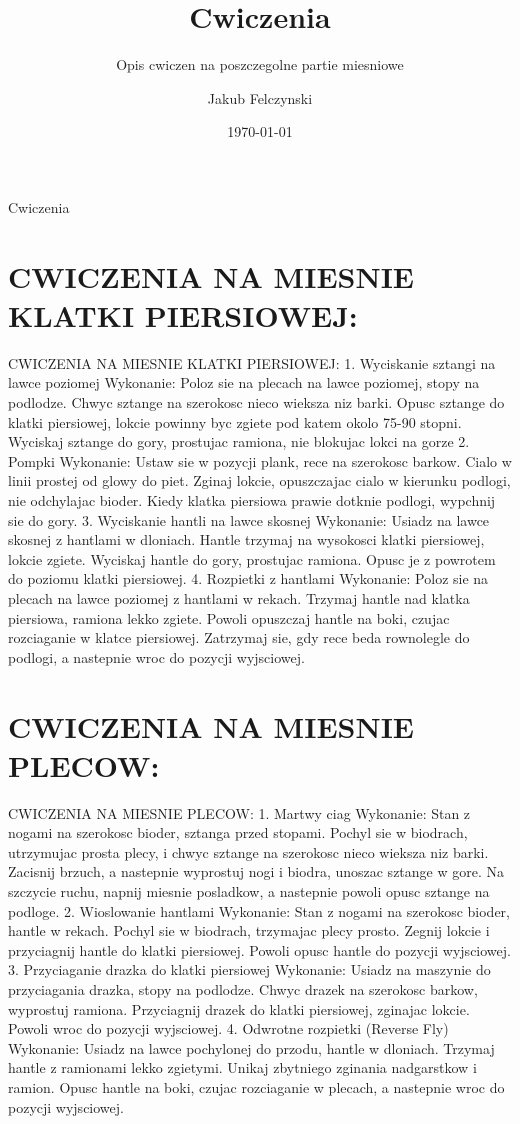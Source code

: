 \documentclass{beamer}
\title{Cwiczenia}
\subtitle{Opis cwiczen na poszczegolne partie miesniowe}
\author{Jakub Felczynski}
\date{\today}
\begin{document}
\begin{frame}{Cwiczenia}
\titlepage
\end{frame}
\section{CWICZENIA NA MIESNIE KLATKI PIERSIOWEJ:}
\begin{frame}{CWICZENIA NA MIESNIE KLATKI PIERSIOWEJ:}
1. Wyciskanie sztangi na lawce poziomej
Wykonanie:
Poloz sie na plecach na lawce poziomej, stopy na podlodze.
Chwyc sztange na szerokosc nieco wieksza niz barki.
Opusc sztange do klatki piersiowej, lokcie powinny byc zgiete pod katem okolo 75-90 stopni.
Wyciskaj sztange do gory, prostujac ramiona, nie blokujac lokci na gorze
2. Pompki
Wykonanie:
Ustaw sie w pozycji plank, rece na szerokosc barkow.
Cialo w linii prostej od glowy do piet.
Zginaj lokcie, opuszczajac cialo w kierunku podlogi, nie odchylajac bioder.
Kiedy klatka piersiowa prawie dotknie podlogi, wypchnij sie do gory.
3. Wyciskanie hantli na lawce skosnej
Wykonanie:
Usiadz na lawce skosnej z hantlami w dloniach.
Hantle trzymaj na wysokosci klatki piersiowej, lokcie zgiete.
Wyciskaj hantle do gory, prostujac ramiona.
Opusc je z powrotem do poziomu klatki piersiowej.
4. Rozpietki z hantlami
Wykonanie:
Poloz sie na plecach na lawce poziomej z hantlami w rekach.
Trzymaj hantle nad klatka piersiowa, ramiona lekko zgiete.
Powoli opuszczaj hantle na boki, czujac rozciaganie w klatce piersiowej.
Zatrzymaj sie, gdy rece beda rownolegle do podlogi, a nastepnie wroc do pozycji wyjsciowej.
\end{frame}
\section{CWICZENIA NA MIESNIE PLECOW:}
\begin{frame}{CWICZENIA NA MIESNIE PLECOW:}
1. Martwy ciag
Wykonanie:
Stan z nogami na szerokosc bioder, sztanga przed stopami.
Pochyl sie w biodrach, utrzymujac prosta plecy, i chwyc sztange na szerokosc nieco wieksza niz barki.
Zacisnij brzuch, a nastepnie wyprostuj nogi i biodra, unoszac sztange w gore.
Na szczycie ruchu, napnij miesnie posladkow, a nastepnie powoli opusc sztange na podloge.
2. Wioslowanie hantlami
Wykonanie:
Stan z nogami na szerokosc bioder, hantle w rekach.
Pochyl sie w biodrach, trzymajac plecy prosto.
Zegnij lokcie i przyciagnij hantle do klatki piersiowej.
Powoli opusc hantle do pozycji wyjsciowej.
3. Przyciaganie drazka do klatki piersiowej
Wykonanie:
Usiadz na maszynie do przyciagania drazka, stopy na podlodze.
Chwyc drazek na szerokosc barkow, wyprostuj ramiona.
Przyciagnij drazek do klatki piersiowej, zginajac lokcie.
Powoli wroc do pozycji wyjsciowej.
4. Odwrotne rozpietki (Reverse Fly)
Wykonanie:
Usiadz na lawce pochylonej do przodu, hantle w dloniach.
Trzymaj hantle z ramionami lekko zgietymi.
Unikaj zbytniego zginania nadgarstkow i ramion.
Opusc hantle na boki, czujac rozciaganie w plecach, a nastepnie wroc do pozycji wyjsciowej.
\end{frame}
\end{document}
